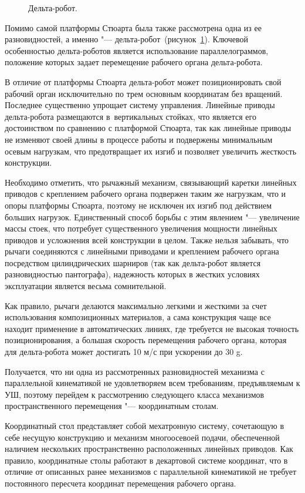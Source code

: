 \begin{figure}[ht]
	\caption{Дельта-робот.}\label{fig:delta}
\end{figure}

Помимо самой платформы Стюарта была также рассмотрена одна из ее разновидностей, а именно "--- дельта-робот~(рисунок~\cref{fig:delta}). Ключевой особенностью дельта-роботов является использование параллелограммов, положение которых задает перемещение рабочего органа дельта-робота.

В отличие от платформы Стюарта дельта-робот может позиционировать свой рабочий орган исключительно по трем основным координатам без вращений. Последнее существенно упрощает систему управления. Линейные приводы дельта-робота размещаются в~вертикальных стойках, что является его достоинством по сравнению с платформой Стюарта, так как линейные приводы не изменяют своей длины в процессе работы и подвержены минимальным осевым нагрузкам, что предотвращает их изгиб и позволяет увеличить жесткость конструкции.

Необходимо отметить, что рычажный механизм, связывающий каретки линейных приводов с креплением рабочего органа подвержен таким же нагрузкам, что и опоры платформы Стюарта, поэтому не исключен их изгиб под действием больших нагрузок. Единственный способ борьбы с этим явлением "--- увеличение массы стоек, что потребует существенного увеличения мощности линейных приводов и усложнения всей конструкции в целом. Также нельзя забывать, что рычаги соединяются с линейными приводами и креплением рабочего органа посредством цилиндрических шарниров (так как дельта-робот является разновидностью пантографа), надежность которых в жестких условиях эксплуатации является весьма сомнительной.

Как правило, рычаги делаются максимально легкими и жесткими за счет использования композиционных материалов, а сама конструкция чаще все находит применение в автоматических линиях, где требуется не высокая точность позиционирования, а большая скорость перемещения рабочего органа, которая для дельта-робота может достигать 10 м/с при ускорении до 30 g.

Получается, что ни одна из рассмотренных разновидностей механизма с параллельной кинематикой не удовлетворяем всем требованиям, предъявляемым к УШ, поэтому перейдем к рассмотрению следующего класса механизмов пространственного перемещения "--- координатным столам.

Координатный стол представляет собой мехатронную систему, сочетающую в себе несущую конструкцию и механизм многоосевоей подачи, обеспеченной наличием нескольких пространственно расположенных линейных приводов. Как правило, координатные столы работают в декартовой системе координат, что в отличие от описанных ранее механизмов с параллельной кинематикой не требует постоянного пересчета координат перемещения рабочего органа.


